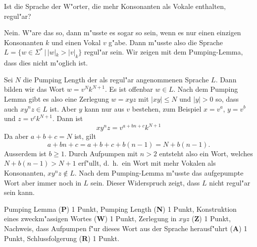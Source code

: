 Ist die Sprache der W"orter, die mehr Konsonanten als Vokale enthalten,
regul"ar?

\begin{loesung}
Nein. W"are das so, dann m"usste es sogar so sein, wenn es nur einen
einzigen Konsonanten $k$ und einen Vokal $v$ g"abe.
Dann m"usste also die Sprache $L=\{ w\in\Sigma^*\,|\, |w|_k > |v|_k\}$
regul"ar sein. Wir zeigen mit dem Pumping-Lemma, dass dies nicht m"oglich
ist.

Sei $N$ die Pumping Length der als regul"ar angenommenen Sprache $L$.
Dann bilden wir das Wort $w=v^{N}k^{N+1}$. Es ist offenbar $w\in L$.
Nach dem Pumping Lemma gibt es also eine Zerlegung $w=xyz$ mit
$|xy|\le N$ und $|y|>0$ so, dass auch $xy^nz\in L$ ist.
Aber $y$ kann nur aus $v$ bestehen, zum Beispiel $x=v^a$, $y=v^b$ und
$z=v^ck^{N+1}$. Dann ist
\[
xy^nz=v^{a+bn+c}k^{N+1}
\]
Da aber $a+b+c=N$ ist, gilt
\[
a+bn+c=a+b+c + b(n-1)=N+b(n-1).
\]
Ausserdem ist $b\ge 1$.
Durch Aufpumpen mit $n> 2$ entsteht also ein Wort, welches
$N+b(n-1)> N+1$ erf"ullt, d.~h.~ein Wort mit mehr Vokalen als
Konsonanten, $xy^nz\not\in L$. Nach dem Pumping-Lemma m"usste das
aufgepumpte Wort aber immer noch in $L$ sein. Dieser Widerspruch
zeigt, dass $L$ nicht regul"ar sein kann.
\end{loesung}

\begin{bewertung}
Pumping Lemma ({\bf P}) 1 Punkt,
Pumping Length ({\bf N}) 1 Punkt,
Konstruktion eines zweckm"assigen Wortes ({\bf W}) 1 Punkt,
Zerlegung in $xyz$ ({\bf Z}) 1 Punkt,
Nachweis, dass Aufpumpen f"ur dieses Wort aus der Sprache herausf"uhrt
({\bf A}) 1 Punkt,
Schlussfolgerung ({\bf R}) 1 Punkt.
\end{bewertung}
